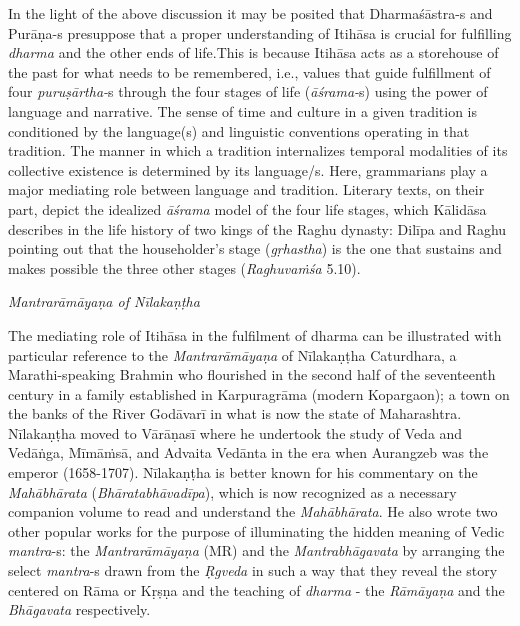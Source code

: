 In the light of the above discussion it may be posited that Dharmaśāstra-s and Purāṇa-s presuppose that a proper understanding of Itihāsa is crucial for fulfilling \textit{dharma} and the other ends of life.This is because Itihāsa acts as a storehouse of the past for what needs to be remembered, i.e., values that guide fulfillment of four \textit{puruṣārtha-}s through the four stages of life (\textit{āśrama-}s) using the power of language and narrative. The sense of time and culture in a given tradition is conditioned by the language(s) and linguistic conventions operating in that tradition. The manner in which a tradition internalizes temporal modalities of its collective existence is determined by its language/s. Here, grammarians play a major mediating role between language and tradition. Literary texts, on their part, depict the idealized \textit{āśrama} model of the four life stages, which Kālidāsa describes in the life history of two kings of the Raghu dynasty: Dilīpa and Raghu pointing out that the householder’s stage (\textit{gṛhastha}) is the one that sustains and makes possible the three other stages (\textit{Raghuvaṁśa} 5.10).

\textit{Mantrarāmāyaṇa of Nīlakaṇṭha }

The mediating role of Itihāsa in the fulfilment of dharma can be illustrated with particular reference to the \textit{Mantrarāmāyaṇa} of Nīlakaṇṭha Caturdhara, a Marathi-speaking Brahmin who flourished in the second half of the seventeenth century in a family established in Karpuragrāma (modern Kopargaon); a town on the banks of the River Godāvarī in what is now the state of Maharashtra. Nīlakaṇṭha moved to Vārāṇasī where he undertook the study of Veda and Vedāṅga, Mīmāṁsā, and Advaita Vedānta in the era when Aurangzeb was the emperor (1658-1707). Nīlakaṇṭha is better known for his commentary on the \textit{Mahābhārata} (\textit{Bhāratabhāvadīpa}), which is now recognized as a necessary companion volume to read and understand the \textit{Mahābhārata}. He also wrote two other popular works for the purpose of illuminating the hidden meaning of Vedic \textit{mantra}-s: the \textit{Mantrarāmāyaṇa} (MR) and the \textit{Mantrabhāgavata} by arranging the select \textit{mantra}-s drawn from the \textit{Ṛgveda} in such a way that they reveal the story centered on Rāma or Kṛṣṇa and the teaching of \textit{dharma} - the \textit{Rāmāyaṇa} and the \textit{Bhāgavata} respectively.


